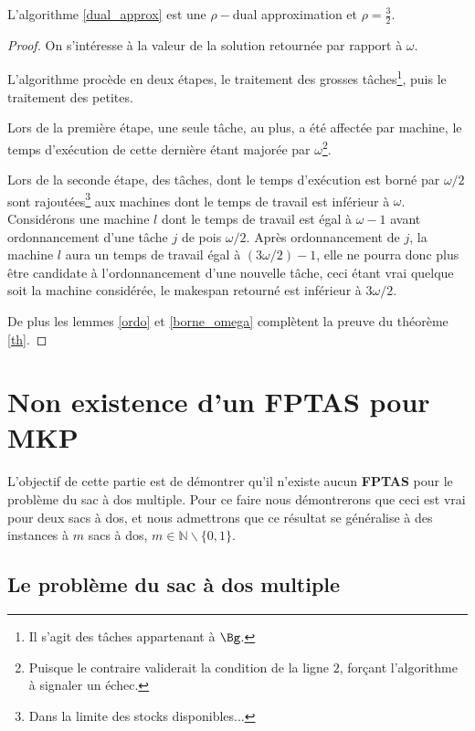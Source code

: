 \documentclass[a4paper,12pt]{thesis}
\begin{document}
\begin{nthrm}
    \label{th}
    L'algorithme \ref{dual_approx} est une $\rho-$dual approximation et $\rho = \frac{3}{2}$.
\end{nthrm}

\begin{proof}
    On s'intéresse à la valeur de la solution retournée par rapport à $\omega$.

    L'algorithme procède en deux étapes, le traitement des grosses tâches\footnote{Il s'agit des
    tâches appartenant à $\Bg$.}, puis le traitement des petites. 
    
    Lors de la première étape, une seule tâche, au plus, a été affectée par machine, le temps
    d'exécution de cette dernière étant majorée par $\omega$\footnote{Puisque le contraire
    validerait la condition de la ligne $2$, forçant l'algorithme à signaler un échec.}. 

    Lors de la seconde étape, des tâches, dont le temps d'exécution est borné par $\omega / 2$ sont
    rajoutées\footnote{Dans la limite des stocks disponibles...} aux machines dont le temps de
    travail est inférieur à $\omega$. Considérons une machine $l$ dont le temps de travail est égal
    à $\omega - 1$ avant ordonnancement d'une tâche $j$ de pois $\omega / 2$. Après ordonnancement
    de $j$, la machine $l$ aura un temps de travail égal à $(3 \omega/2) - 1$, elle ne pourra donc
    plus être candidate à l'ordonnancement d'une nouvelle tâche, ceci étant vrai quelque soit la
    machine considérée, le makespan retourné est inférieur à $3 \omega/2$.

    De plus les lemmes \ref{ordo} et \ref{borne_omega} complètent la preuve du théorème \ref{th}.
\end{proof}

\section*{Non existence d'un \textbf{FPTAS} pour MKP}

L'objectif de cette partie est de démontrer qu'il n'existe aucun \textbf{FPTAS} pour le problème du
sac à dos multiple. Pour ce faire nous démontrerons que ceci est vrai pour deux sacs à dos, et nous
admettrons que ce résultat se généralise à des instances à $m$ sacs à dos, $m \in \mathbb{N}
\backslash \{0, 1\}$.

\subsection*{Le problème du sac à dos multiple}
\end{document}
